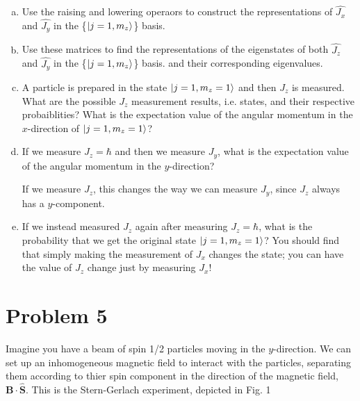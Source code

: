 \documentclass[10pt]{article}
\begin{document}
\begin{enumerate}[(a)]
\begin{solution}
        \end{solution}
        \item Use the raising and lowering operaors to construct the representations of $\hat{J_x}$ and $\hat{J_y}$ in the \{$\ket{j = 1, m_z}$\} basis.
        \item Use these matrices to find the representations of the eigenstates of both $\hat{J_z}$ and $\hat{J_y}$ in the \{$\ket{j = 1, m_z}$\} basis. and their corresponding eigenvalues. 
        \item A particle is prepared in the state $\ket{j = 1, m_z = 1}$ and then $J_z$ is measured. What are the possible $J_z$ measurement results, i.e. states, and their respective probaiblities? What is the expectation value of the angular momentum in the $x$-direction of $\ket{j = 1, m_z = 1}$?
        \item If we measure $J_z = \hbar$ and then we measure $J_y$, what is the expectation value of the angular momentum in the $y$-direction?
        
        \begin{solution}
            If we measure $J_z$, this changes the way we can measure $J_y$, since $J_z$ always has a $y$-component. 
        \end{solution}
        \item If we instead measured $J_z$ again after measuring $J_z = \hbar$, what is the probability that we get the original state $\ket{j = 1, m_z = 1}$? You should find that simply making the measurement of $J_x$ changes the state; you can have the value of $J_z$ change just by measuring $J_x$!
    \end{enumerate}

    \pagebreak

    \section*{Problem 5}

    Imagine you have a beam of spin 1/2 particles moving in the $y$-direction. We can set up an inhomogeneous magnetic field to interact with the particles, separating them according to thier spin component in the direction of the magnetic field, $\mathbf{B \cdot \hat S}$. This is the Stern-Gerlach experiment, depicted in Fig. 1
\end{document}

